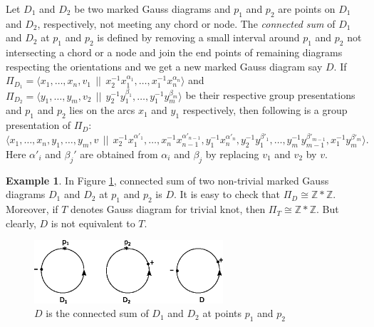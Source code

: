 \documentclass[11 pt, reqno]{amsart}
\theoremstyle{definition}
\newtheorem{example}[theorem]{Example}
\numberwithin{equation}{subsection}
\begin{document}
\par
Let $D_1$ and $D_2$ be two marked Gauss diagrams and $p_1$ and $p_2$ are points on $D_1$ and $D_2$, respectively, not meeting any chord or node. The \textit{connected sum} of $D_1$ and $D_2$ at $p_1$ and $p_2$ is defined by removing a small interval around $p_1$ and $p_2$ not intersecting a chord or a node and join the end points of remaining diagrams respecting the orientations and we get a new marked Gauss diagram say $D$. If $\Pi_{D_1}=\langle x_1, \ldots, x_n, v_1~~||~~x_2^{-1}x_1^{\alpha_1}, \ldots, x_1^{-1}x_n^{\alpha_n} \rangle$ and
$\Pi_{D_2}=\langle y_1, \ldots, y_m, v_2~~||~~y_2^{-1}y_1^{\beta_1}, \ldots, y_1^{-1} y_m^{\beta_m} \rangle$ be their respective group presentations and $p_1$ and $p_2$ lies on the arcs $x_1$ and $y_1$ respectively, then following is a group presentation of $\Pi_D$:
$$\langle x_1, \ldots, x_n, y_1, \ldots, y_m, v~~||~~ x_2^{-1} x_1^{{\alpha}'_1}, \ldots, x_n^{-1}x_{n-1}^{\alpha'_{n-1}}, y_1^{-1} x_n^{\alpha'_n}, y_2^{-1}y_1^{\beta'_1}, \ldots, y_m^{-1}y_{m-1}^{\beta'_{m-1}}, x_1^{-1}y_m^{\beta'_m} \rangle.$$ Here $\alpha'_i$ and $\beta_j'$ are obtained from $\alpha_i$ and $\beta_j$ by replacing $v_1$ and $v_2$ by $v$.

\begin{example}
In Figure \ref{F: ConnectedSum}, connected sum of two non-trivial marked Gauss diagrams $D_1$ and $D_2$ at $p_1$ and $p_2$ is $D$. It is easy to check that $\Pi_D \cong \mathbb{Z} * \mathbb{Z}$. Moreover, if $T$ denotes Gauss diagram for trivial knot, then $\Pi_T \cong \mathbb{Z} * \mathbb{Z}$. But clearly, $D$ is not equivalent to $T$.

\begin{figure}[H]
\includegraphics[width=7cm]{connectedsum.eps}
\caption{$D$ is the connected sum of $D_1$ and $D_2$ at points $p_1$ and $p_2$} \label{F: ConnectedSum}
\end{figure}
\end{example}
\end{document}

